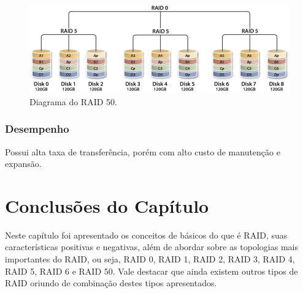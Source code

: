 		\begin{figure}[htb]
			\begin{center}
				
				\includegraphics[clip,width=15.0cm]{images/RAID_50.png}
				\caption{Diagrama do RAID 50. }
				\label{fig:raid50}
			\end{center}
		\end{figure} 
		
		\subsubsection{Desempenho}
		Possui alta taxa de transferência, porém com alto custo de manutenção e expansão.
		
	
	\section{Conclusões do Capítulo}
	Neste capítulo foi apresentado os conceitos de básicos do que é RAID, suas características positivas e negativas, além de abordar sobre as topologias mais importantes do RAID, ou seja, RAID 0, RAID 1, RAID 2, RAID 3, RAID 4, RAID 5, RAID 6 e RAID 50.
	Vale destacar que ainda existem outros tipos de RAID oriundo de combinação destes tipos apresentados.
		



 

	

